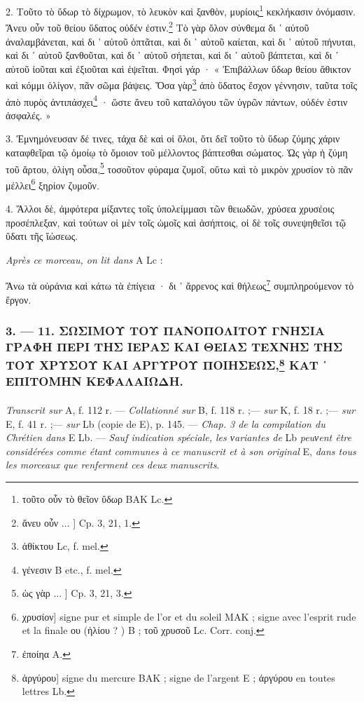 \documentclass[a4paper, 11pt, oneside, polutonikogreek, french]{article}
\begin{document}
2. Τοῦτο τὸ ὕδωρ τὸ δίχρωμον, τὸ λευκὸν καὶ ξανθὸν, μυρίοις\footnote{τοῦτο οὖν τὸ θεῖον ὕδωρ BAK Lc.} κεκλήκασιν ὀνόμασιν. Ἄνευ οὖν τοῦ θείου ὕδατος οὐδέν ἐστιν.\footnote{ἄνευ οὖν ... ] Cp. 3, 21, 1.} Τὸ γὰρ ὅλον σύνθεμα δι ᾽ αὐτοῦ ἀναλαμβάνεται, καὶ δι ' αὐτοῦ ὀπτᾶται, καὶ δι ᾽ αὐτοῦ καίεται, καὶ δι ᾽ αὐτοῦ πήνυται, καὶ δι ᾽ αὐτοῦ ξανθοῦται, καὶ δι ᾽ αὐτοῦ σήπεται, καὶ δι ᾽ αὐτοῦ βάπτεται, καὶ δι ᾽ αὐτοῦ ἰοῦται καὶ ἐξιοῦται καὶ ἑψεῖται. Φησὶ γάρ · « Ἐπιβάλλων ὕδωρ θείου ἄθικτον καὶ κόμμι ὀλίγον, πᾶν σῶμα βάψεις. Ὅσα γὰρ\footnote{ἀθίκτου Lc, f. mel.} ἀπὸ ὕδατος ἔσχον γέννησιν, ταῦτα τοῖς ἀπὸ πυρὸς ἀντιπάσχει\footnote{γένεσιν B etc., f. mel.} · ὥστε ἄνευ τοῦ καταλόγου τῶν ὑγρῶν πάντων, οὐδέν ἐστιν ἀσφαλές. »

3. Ἐμνημόνευσαν δέ τινες, τάχα δὲ καὶ οἱ ὅλοι, ὅτι δεῖ τοῦτο τὸ ὕδωρ ζύμης χάριν καταφθεῖραι τῷ ὁμοίῳ τὸ ὅμοιον τοῦ μέλλοντος βάπτεσθαι σώματος. Ὡς γὰρ ἡ ζύμη τοῦ ἄρτου, ὀλίγη οὖσα,\footnote{ὡς γὰρ ... ] Cp. 3, 21, 3.} τοσοῦτον φύραμα ζυμοῖ, οὕτω καὶ τὸ μικρὸν χρυσίον τὸ πᾶν μέλλει\footnote{χρυσίον] signe pur et simple de l'or et du soleil MAK ; signe avec l'esprit rude et la finale ου (ἡλίου ? ) B ; τοῦ χρυσοῦ Lc. Corr. conj.} ξηρίον ζυμοῦν.

4. Ἄλλοι δὲ, ἀμφότερα μίξαντες τοῖς ὑπολείμμασι τῶν θειωδῶν, χρύσεα χρυσέοις προσέπλεξαν, καὶ τούτων οἱ μὲν τοῖς ὠμοῖς καὶ ἀσήπτοις, οἱ δὲ τοῖς συνεψηθεῖσι τῷ ὕδατι τῆς ἴώσεως.

\bigskip
\centerline{\EightStarTaper}
\centerline{\EightStarTaper\EightStarTaper}
\bigskip

\emph{Après ce morceau, on lit dans} A Lc :

Ἄνω τὰ οὐράνια καὶ κάτω τὰ ἐπίγεια · δι ᾽ ἄρρενος καὶ θήλεως\footnote{ἐποίηα A.} συμπληρούμενον τὸ ἔργον.

\bigskip
\centerline{\EightStarTaper}
\centerline{\EightStarTaper\EightStarTaper}
\bigskip

\subsubsection[3. --- 11. ΣΩΣΙΜΟΥ ΤΟΥ ΠΑΝΟΠΟΛΙΤΟΥ ΓΝΗΣΙΑ ΓΡΑΦΗ ΠΕΡΙ ΤΗΣ ΙΕΡΑΣ ΚΑΙ ΘΕΙΑΣ ΤΕΧΝΗΣ ΤΗΣ ΤΟΥ ΧΡΥΣΟΥ ΚΑΙ ΑΡΓΥΡΟΥ ΠΟΙΗΣΕΩΣ, ΚΑΤ ᾽ ΕΠΙΤΟΜΗΝ ΚΕΦΑΛΑΙΩΔΗ.]{3. --- 11. ΣΩΣΙΜΟΥ ΤΟΥ ΠΑΝΟΠΟΛΙΤΟΥ ΓΝΗΣΙΑ ΓΡΑΦΗ ΠΕΡΙ ΤΗΣ ΙΕΡΑΣ ΚΑΙ ΘΕΙΑΣ ΤΕΧΝΗΣ ΤΗΣ ΤΟΥ ΧΡΥΣΟΥ ΚΑΙ ΑΡΓΥΡΟΥ ΠΟΙΗΣΕΩΣ,\footnote{ἀργύρου] signe du mercure BAK ; signe de l'argent E ; ἀργύρου en toutes lettres Lb.} ΚΑΤ ᾽ ΕΠΙΤΟΜΗΝ ΚΕΦΑΛΑΙΩΔΗ.}
\paragraph{}
\emph{Transcrit sur} A, f. 112 r. --- \emph{Collationné sur} B, f. 118 r. ;--- \emph{sur} K, f. 18 r. ;--- \emph{sur} E, f. 41 r. ;--- \emph{sur} Lb (copie de E), p. 145. --- \emph{Chap. 3 de la compilation du Chrétien dans} E Lb. --- \emph{Sauf indication spéciale, les νariantes de} Lb \emph{peuνent être considérées comme étant communes à ce manuscrit et à son original} E, \emph{dans tous les morceaux que renferment ces deux manuscrits}.
\end{document}
